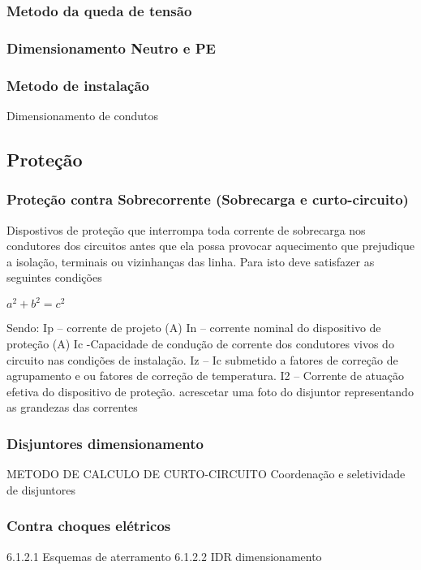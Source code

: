 \subsubsection{ Metodo da queda de tensão}

\subsubsection{Dimensionamento Neutro e PE}

\subsubsection{ Metodo de instalação}

Dimensionamento de condutos
\subsection{ Proteção}

\subsubsection{Proteção contra Sobrecorrente (Sobrecarga e curto-circuito)}

Dispostivos de proteção que interrompa toda corrente de sobrecarga nos condutores dos circuitos antes que ela possa provocar aquecimento que prejudique a isolação, terminais ou vizinhanças das linha. Para isto deve satisfazer as seguintes condições

	$a^2 + b^2 = c^2$


Sendo:
Ip – corrente de projeto (A)
In – corrente nominal do dispositivo de proteção (A)
Ic -Capacidade de condução de corrente dos condutores vivos do circuito nas condições de instalação.
Iz –  Ic submetido a fatores de correção de agrupamento e ou fatores de correção de temperatura.
I2 – Corrente de atuação efetiva do dispositivo de proteção. 
acrescetar uma foto do disjuntor representando as grandezas das correntes

\subsubsection{ Disjuntores dimensionamento}
		
		METODO DE CALCULO DE CURTO-CIRCUITO 
		Coordenação e seletividade de disjuntores
\subsubsection{ Contra choques elétricos }
	6.1.2.1 Esquemas de aterramento
	6.1.2.2 IDR dimensionamento 

